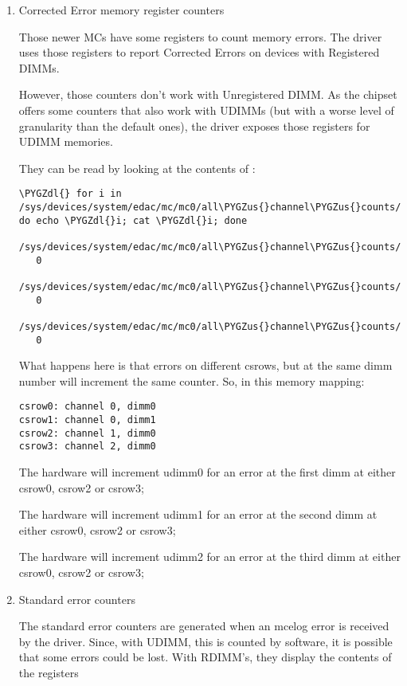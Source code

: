 \documentclass[a4paper,8pt,english]{sphinxmanual}
\def\PYGZus{\char`\_}
\def\PYGZdl{\char`\$}
\begin{document}
\begin{enumerate}
\item {} 
Corrected Error memory register counters

Those newer MCs have some registers to count memory errors. The driver
uses those registers to report Corrected Errors on devices with Registered
DIMMs.

However, those counters don't work with Unregistered DIMM. As the chipset
offers some counters that also work with UDIMMs (but with a worse level of
granularity than the default ones), the driver exposes those registers for
UDIMM memories.

They can be read by looking at the contents of :

\begin{Verbatim}[commandchars=\\\{\}]
\PYGZdl{} for i in /sys/devices/system/edac/mc/mc0/all\PYGZus{}channel\PYGZus{}counts/*; do echo \PYGZdl{}i; cat \PYGZdl{}i; done
   /sys/devices/system/edac/mc/mc0/all\PYGZus{}channel\PYGZus{}counts/udimm0
   0
   /sys/devices/system/edac/mc/mc0/all\PYGZus{}channel\PYGZus{}counts/udimm1
   0
   /sys/devices/system/edac/mc/mc0/all\PYGZus{}channel\PYGZus{}counts/udimm2
   0
\end{Verbatim}

What happens here is that errors on different csrows, but at the same
dimm number will increment the same counter.
So, in this memory mapping:

\begin{Verbatim}[commandchars=\\\{\}]
csrow0: channel 0, dimm0
csrow1: channel 0, dimm1
csrow2: channel 1, dimm0
csrow3: channel 2, dimm0
\end{Verbatim}

The hardware will increment udimm0 for an error at the first dimm at either
csrow0, csrow2  or csrow3;

The hardware will increment udimm1 for an error at the second dimm at either
csrow0, csrow2  or csrow3;

The hardware will increment udimm2 for an error at the third dimm at either
csrow0, csrow2  or csrow3;

\item {} 
Standard error counters

The standard error counters are generated when an mcelog error is received
by the driver. Since, with UDIMM, this is counted by software, it is
possible that some errors could be lost. With RDIMM's, they display the
contents of the registers

\end{enumerate}
\end{document}
